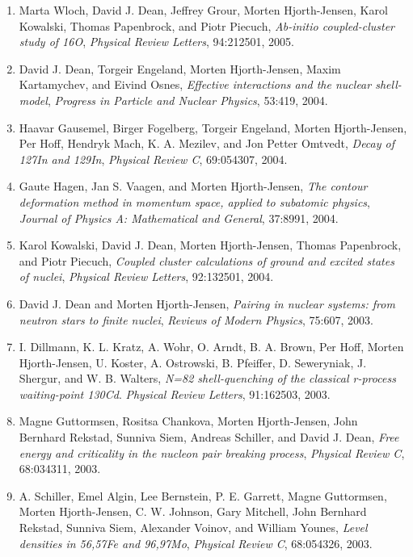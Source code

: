 \documentclass[a4wide,10pt]{article}
\begin{document}
\begin{enumerate}
\item Marta Wloch, David J. Dean, Jeffrey Grour, Morten Hjorth-Jensen, Karol   Kowalski, Thomas Papenbrock, and Piotr Piecuch, \emph{Ab-initio coupled-cluster study of 16O},  \emph{Physical Review Letters}, 94:212501, 2005. 

\item David J. Dean, Torgeir Engeland, Morten Hjorth-Jensen, Maxim Kartamychev, and   Eivind Osnes, \emph{Effective interactions and the nuclear shell-model},  \emph{Progress in Particle and Nuclear Physics}, 53:419, 2004. 

\item Haavar Gausemel, Birger Fogelberg, Torgeir Engeland, Morten Hjorth-Jensen,   Per Hoff, Hendryk Mach, K. A. Mezilev, and Jon Petter Omtvedt, \emph{Decay of 127In and 129In},  \emph{Physical Review C}, 69:054307, 2004. 

\item Gaute Hagen, Jan S. Vaagen, and Morten Hjorth-Jensen,  \emph{The contour deformation method in momentum space, applied to   subatomic physics},  \emph{Journal of Physics A: Mathematical and General}, 37:8991, 2004. 

\item Karol Kowalski, David J. Dean, Morten Hjorth-Jensen, Thomas Papenbrock, and   Piotr Piecuch, \emph{Coupled cluster calculations of ground and excited states of nuclei},  \emph{Physical Review Letters}, 92:132501, 2004. 

\item David J. Dean and Morten Hjorth-Jensen,  \emph{Pairing in nuclear systems: from neutron stars to finite nuclei}, \emph{Reviews of Modern Physics}, 75:607, 2003. 

\item I. Dillmann, K. L. Kratz, A. Wohr, O. Arndt, B. A. Brown, Per Hoff, Morten   Hjorth-Jensen, U. Koster, A. Ostrowski, B. Pfeiffer, D. Seweryniak,   J. Shergur, and W. B. Walters,  \emph{N=82 shell-quenching of the classical r-process waiting-point 130Cd}.  \emph{Physical Review Letters}, 91:162503, 2003. 

\item Magne Guttormsen, Rositsa Chankova, Morten Hjorth-Jensen, John Bernhard   Rekstad, Sunniva Siem, Andreas Schiller, and David J. Dean, \emph{Free energy and criticality in the nucleon pair breaking   process},  \emph{Physical Review C}, 68:034311, 2003. 

\item A. Schiller, Emel Algin, Lee Bernstein, P. E. Garrett, Magne Guttormsen, Morten   Hjorth-Jensen, C. W. Johnson, Gary Mitchell, John Bernhard Rekstad, Sunniva   Siem, Alexander Voinov, and William Younes, \emph{Level densities in 56,57Fe and 96,97Mo},  \emph{Physical Review C}, 68:054326, 2003. 


\end{enumerate}
\end{document}
